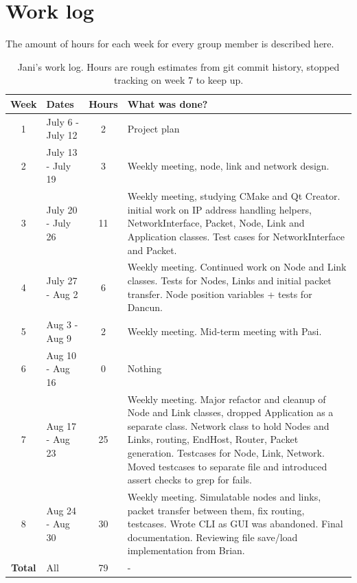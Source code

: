 \section{Work log}
The amount of hours for each week for every group member is described here.

\begin{table}[!htbp]
\footnotesize{
\begin{tabular}{c|p{}|c|p{}}
\textbf{Week} & \textbf{Dates} & \textbf{Hours} & \textbf{What was done?} \\
\hline 1 & July 6 - July 12     & 2 & Project plan \\
\hline 2 & July 13 - July 19    & 3 & Weekly meeting, node, link and network design. \\
\hline 3 & July 20 - July 26    & 11 & Weekly meeting, studying CMake and Qt Creator. initial work on IP address handling helpers, NetworkInterface, Packet, Node, Link and Application classes. Test cases for NetworkInterface and Packet.  \\
\hline 4 & July 27 - Aug 2      & 6 & Weekly meeting. Continued work on Node and Link classes. Tests for Nodes, Links and initial packet transfer. Node position variables + tests for Dancun. \\
\hline 5 & Aug 3 - Aug 9        & 2 & Weekly meeting. Mid-term meeting with Pasi. \\
\hline 6 & Aug 10 - Aug 16      & 0 & Nothing \\
\hline 7 & Aug 17 - Aug 23      & 25 & Weekly meeting. Major refactor and cleanup of Node and Link classes, dropped Application as a separate class. Network class to hold Nodes and Links, routing, EndHost, Router, Packet generation. Testcases for Node, Link, Network. Moved testcases to separate file and introduced assert checks to grep for fails.  \\
\hline 8 & Aug 24 - Aug 30      & 30 & Weekly meeting. Simulatable nodes and links, packet transfer between them, fix routing, testcases. Wrote CLI as GUI was abandoned. Final documentation. Reviewing file save/load implementation from Brian. \\
\hline\hline\textbf{Total}&All  & 79 & - \\
\end{tabular}
}
\caption{Jani's work log. Hours are rough estimates from git commit history, stopped tracking on week 7 to keep up.}
\label{table:worklog-jani}
\end{table}

